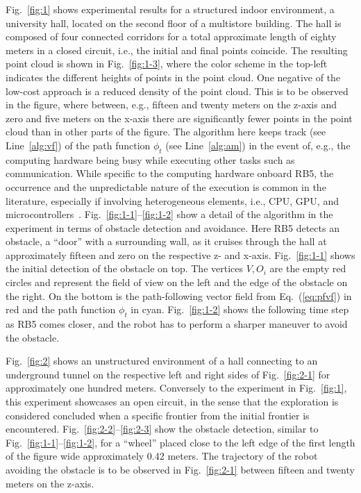 \documentclass[lettersize,journal,twoside]{IEEEtran}
\theoremstyle{definition}
\begin{document}
Fig.~\ref{fig:1} shows experimental results for a structured indoor environment, a university hall, located on the second floor of a multistore building. The hall is composed of four connected corridors for a total approximate length of eighty meters in a closed circuit, i.e., the initial and final points coincide. The resulting point cloud is shown in Fig.~\ref{fig:1-3}, where the color scheme in the top-left indicates the different heights of points in the point cloud. 
One negative of the low-cost approach is a reduced density of the point cloud. This 
is to be observed in the figure, where between, e.g., fifteen and twenty meters on the z-axis and zero and five meters on the x-axis there are significantly fewer points in the point cloud than in other parts of the figure. 
The algorithm here keeps track (see Line~\ref{alg:vf}) of the path function $\phi_t$ (see Line~\ref{alg:am}) in the event of, e.g., the computing hardware being busy while executing other tasks such as communication. While specific to the computing hardware onboard RB5, the occurrence and the unpredictable nature of the execution is common in the literature, especially if involving heterogeneous elements, i.e., CPU, GPU, and microcontrollers~\cite{seewald2019coarse}.
%
Fig.~\ref{fig:1-1}--\ref{fig:1-2} show a detail of the algorithm in the experiment in terms of obstacle detection and avoidance. Here RB5 detects an obstacle, a ``door'' with a surrounding wall, as it cruises through the hall at approximately fifteen and zero on the respective z- and x-axis. Fig.~\ref{fig:1-1} shows the initial detection of the obstacle on top. The vertices $V, O_i$ are the empty red circles and represent the field of view on the left and the edge of the obstacle on the right. On the bottom is the path-following vector field from Eq.~(\ref{eq:pfvf}) in red and the path function $\phi_t$ in cyan. Fig.~\ref{fig:1-2} shows the following time step as RB5 comes closer, and the robot has to perform a sharper maneuver to avoid the obstacle.

Fig.~\ref{fig:2} shows an unstructured environment of a hall connecting to an underground tunnel on the respective left and right sides of Fig.~\ref{fig:2-1} for approximately one hundred meters. Conversely to the experiment in Fig.~\ref{fig:1}, this experiment showcases an open circuit, in the sense that the exploration is considered concluded when a specific frontier from the initial frontier is encountered. Fig.~\ref{fig:2-2}--\ref{fig:2-3} show the obstacle detection, similar to Fig.~\ref{fig:1-1}--\ref{fig:1-2}, for a ``wheel'' placed close to the left edge of the first length of the figure wide approximately 0.42 meters. The trajectory of the robot avoiding the obstacle is to be observed in Fig.~\ref{fig:2-1} between fifteen and twenty meters on the z-axis.
\end{document}
